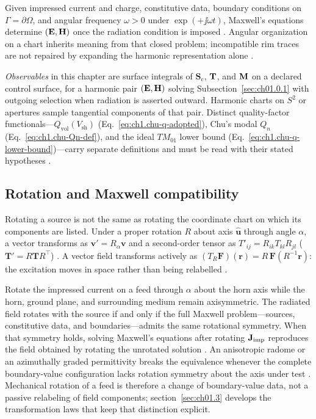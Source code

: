 Given impressed current and charge, constitutive data, boundary conditions on
$\Gamma=\partial\Omega$, and angular frequency $\omega>0$ under $\exp(+\jj\omega t)$,
Maxwell's equations determine $(\mathbf{E},\mathbf{H})$ once the radiation condition is imposed
\cite{maxwell1873,stratton1941}. Angular organization on a chart inherits meaning from that closed problem; incompatible rim traces are not repaired by expanding the harmonic representation alone \cite{stratton1941,harrington2001}.

\begin{remark}
\label{rem:ch1.maxwell-admissibility}
\emph{Observables} in this chapter are surface integrals of $\mathbf{S}_\mathrm{c}$, $\mathbf{T}$, and $\mathbf{M}$ on a declared control surface, for a harmonic pair $(\mathbf{E},\mathbf{H})$ solving Subsection~\ref{sec:ch01.0.1} with outgoing selection when radiation is asserted outward. Harmonic charts on $S^2$ or apertures sample tangential components of that pair. Distinct quality-factor functionals---$Q_{\mathrm{vol}}(V_{\mathrm{sh}})$ (Eq.~\eqref{eq:ch1.chu-q-adopted}), Chu's modal $Q_n$ (Eq.~\eqref{eq:ch1.chu-Qn-def}), and the ideal $TM_{01}$ lower bound (Eq.~\eqref{eq:ch1.chu-q-lower-bound})---carry separate definitions and must be read with their stated hypotheses \cite{chu1948,mcclean1996}.
\end{remark}

\subsection{Rotation and Maxwell compatibility}
\label{sec:ch01.0.2}

Rotating a source is not the same as rotating the coordinate chart on which its components are listed. Under a proper rotation $R$ about axis $\hat{\mathbf{u}}$ through angle $\alpha$, a vector transforms as $\mathbf{v}'=R_\alpha\mathbf{v}$ and a second-order tensor as $T'_{ij}=R_{ik}T_{kl}R_{jl}$ ($\mathbf{T}'=R\mathbf{T}R^\top$) \cite{stratton1941}. A vector field transforms actively as $(T_R\mathbf{F})(\mathbf{r})=R\,\mathbf{F}(R^{-1}\mathbf{r})$: the excitation moves in space rather than being relabelled \cite{hansen1988}.

Rotate the impressed current on a feed through $\alpha$ about the horn axis while the
horn, ground plane, and surrounding medium remain axisymmetric. The radiated field rotates
with the source if and only if the full Maxwell problem---sources, constitutive data, and
boundaries---admits the same rotational symmetry. When that symmetry holds, solving
Maxwell's equations after rotating $\mathbf{J}_{\mathrm{imp}}$ reproduces the field obtained by rotating the
unrotated solution \cite{stratton1941,hansen1988}. An anisotropic radome or an
azimuthally graded permittivity breaks the equivalence whenever the complete
boundary-value configuration lacks rotation symmetry about the axis under test
\cite{stratton1941}. Mechanical rotation of a feed is therefore a change of boundary-value data, not a passive relabeling of field components; section~\ref{sec:ch01.3} develops the transformation laws that keep that distinction explicit.


